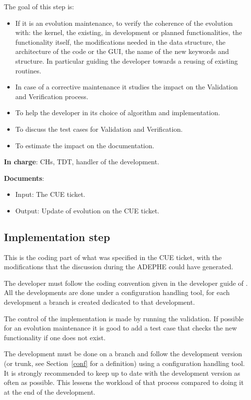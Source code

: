 The goal of this step is:
\begin{itemize}
\item If it is an evolution maintenance, to verify the coherence of the
  evolution with: the kernel, the existing, in development or planned
  functionalities, the functionality itself, the modifications needed in the
  data structure, the architecture of the code or the GUI, the name of the new
  keywords and structure. In particular guiding the developer towards a reusing
  of existing routines.
\item In case of a corrective maintenance it studies the impact on the
  Validation and Verification process.
\item To help the developer in its choice of algorithm and implementation.
\item To discuss the test cases for Validation and Verification.
\item To estimate the impact on the documentation.
\end{itemize}

\textbf{In charge}: CHs, TDT, handler of the development.

\textbf{Documents}:
\begin{itemize}
\item Input: The CUE ticket.
\item Output: Update of evolution on the CUE ticket.
\end{itemize}


\subsection{Implementation step}

This is the coding part of what was specified in the CUE ticket, with the
modifications that the discussion during the ADEPHE could have generated.

The developer must follow the coding convention given in the developer guide of
\telemacsystem. All the developments are done under a configuration handling
tool, for each development a branch is created dedicated to that development.

The control of the implementation is made by running the \telemacsystem{}
validation. If possible for an evolution maintenance it is good to add a test
case that checks the new functionality if one does not exist.

The development must be done on a branch and follow the development version (or
trunk, see Section~\ref{conf} for a definition) using a configuration handling
tool. It is strongly recommended to keep up to date with the development
version as often as possible. This lessens the workload of that process
compared to doing it at the end of the development.

